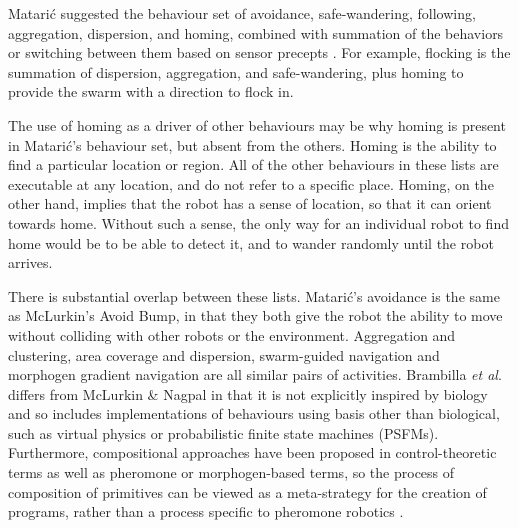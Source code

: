 \documentclass[]{article}
\begin{document}
Matari\'c suggested the behaviour set of avoidance, safe-wandering, following, aggregation, dispersion, and homing, combined with summation of the behaviors or switching between them based on sensor precepts \cite{mataric1995designing}. For example, flocking is the summation of dispersion, aggregation, and safe-wandering, plus homing to provide the swarm with a direction to flock in. 

The use of homing as a driver of other behaviours may be why homing is present in Matari\'c's behaviour set, but absent from the others. 
Homing is the ability to find a particular location or region. 
All of the other behaviours in these lists are executable at any location, and do not refer to a specific place. 
Homing, on the other hand, implies that the robot has a sense of location, so that it can orient towards home. 
Without such a sense, the only way for an individual robot to find home would be to be able to detect it, and to wander randomly until the robot arrives. 

There is substantial overlap between these lists. Matari\'c's avoidance is the same as McLurkin's Avoid Bump, in that they both give the robot the ability to move without colliding with other robots or the environment. 
Aggregation and clustering, area coverage and dispersion, swarm-guided navigation and morphogen gradient navigation are all similar pairs of activities. 
Brambilla \textit{et al}. differs from McLurkin \& Nagpal in that it is not explicitly inspired by biology and so includes implementations of behaviours using basis other than biological, such as virtual physics or probabilistic finite state machines (PSFMs). 
Furthermore, compositional approaches have been proposed in control-theoretic terms as well as pheromone or morphogen-based terms, so the process of composition of primitives can be viewed as a meta-strategy for the creation of programs, rather than a process specific to pheromone robotics \cite{belta2007symbolic}.
\end{document}
